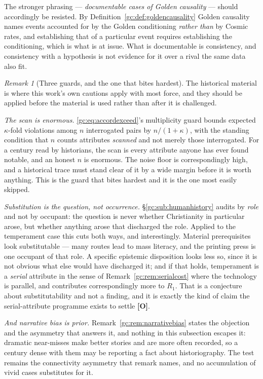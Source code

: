 \documentclass[11pt]{article}
\numberwithin{equation}{section}
\theoremstyle{plain}
\theoremstyle{definition}
\theoremstyle{remark}
\newtheorem{remark}[theorem]{Remark}
\begin{document}
The stronger phrasing --- \emph{documentable cases of Golden causality}
--- should accordingly be resisted. By
Definition~\ref{gc:def:goldencausality} Golden causality names events
accounted for by the Golden conditioning \emph{rather than} by Cosmic
rates, and establishing that of a particular event requires establishing
the conditioning, which is what is at issue. What is documentable is
consistency, and consistency with a hypothesis is not evidence for it
over a rival the same data also fit.

\begin{remark}[Three guards, and the one that bites hardest]
\label{gc:rem:historyguards}
The historical material is where this work's own cautions apply with
most force, and they should be applied before the material is used
rather than after it is challenged.

\emph{The scan is enormous.} \eqref{gc:eq:accordexceed}'s multiplicity
guard bounds expected $\kappa$-fold violations among $n$ interrogated
pairs by $n/(1+\kappa)$, with the standing condition that $n$ counts
attributes \emph{scanned} and not merely those interrogated. For a
century read by historians, the scan is every attribute anyone has ever
found notable, and an honest $n$ is enormous. The noise floor is
correspondingly high, and a historical trace must stand clear of it by a
wide margin before it is worth anything. This is the guard that bites
hardest and it is the one most easily skipped.

\emph{Substitution is the question, not occurrence.}
\S\ref{gc:sub:humanhistory} audits by \emph{role} and not by occupant:
the question is never whether Christianity in particular arose, but
whether anything arose that discharged the role. Applied to the
temperament case this cuts both ways, and interestingly. Material
prerequisites look substitutable --- many routes lead to mass literacy,
and the printing press is one occupant of that role. A specific epistemic
disposition looks less so, since it is not obvious what else would have
discharged it; and if that holds, temperament is a \emph{serial}
attribute in the sense of Remark~\ref{gc:rem:serialcost} where the technology
is parallel, and contributes correspondingly more to $R_1$. That is a
conjecture about substitutability and not a finding, and it is exactly
the kind of claim the serial-attribute programme exists to settle
\textbf{[O]}.

\emph{And narrative bias is prior.} Remark~\ref{gc:rem:narrativebias}
states the objection and the asymmetry that answers it, and nothing in
this subsection escapes it: dramatic near-misses make better stories and
are more often recorded, so a century dense with them may be reporting a
fact about historiography. The test remains the connectivity asymmetry
that remark names, and no accumulation of vivid cases substitutes for it.
\end{remark}
\end{document}
